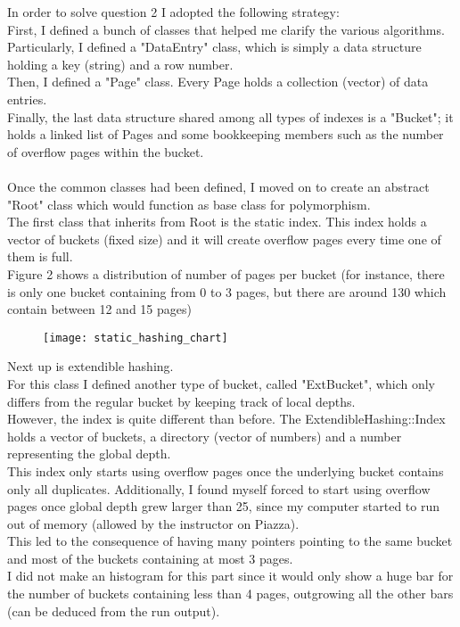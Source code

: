\documentclass[12pt]{report}
\begin{document}
{In order to solve question 2 I adopted the following strategy: \\
First, I defined a bunch of classes that helped me clarify the various algorithms. \\
Particularly, I defined a "DataEntry" class, which is simply a data structure holding a key (string) and a row number. \\
Then, I defined a "Page" class. Every Page holds a collection (vector) of data entries. \\
Finally, the last data structure shared among all types of indexes is a "Bucket"; it holds a linked list of Pages and some bookkeeping members such as the number of overflow pages within the bucket. \\ \\
Once the common classes had been defined, I moved on to create an abstract "Root" class which would function as base class for polymorphism. \\
The first class that inherits from Root is the static index. This index holds a vector of buckets (fixed size) and it will create overflow pages every time one of them is full. \\
Figure 2 shows a distribution of number of pages per bucket (for instance, there is only one bucket containing from 0 to 3 pages, but there are around 130 which contain between 12 and 15 pages)

\begin{figure}[!ht]
	\centering
	\texttt{[image: static\_hashing\_chart]}
	\caption{}
	\centering
	\label{label:graph}
\end{figure}

Next up is extendible hashing. \\
For this class I defined another type of bucket, called "ExtBucket", which only differs from the regular bucket by keeping track of local depths. \\
However, the index is quite different than before. The ExtendibleHashing::Index holds a vector of buckets, a directory (vector of numbers) and a number representing the global depth. \\
This index only starts using overflow pages once the underlying bucket contains only all duplicates. Additionally, I found myself forced to start using overflow pages once global depth grew larger than 25, since my computer started to run out of memory (allowed by the instructor on Piazza). \\
This led to the consequence of having many pointers pointing to the same bucket and most of the buckets containing at most 3 pages. \\
I did not make an histogram for this part since it would only show a huge bar for the number of buckets containing less than 4 pages, outgrowing all the other bars (can be deduced from the run output).

}
\end{document}

